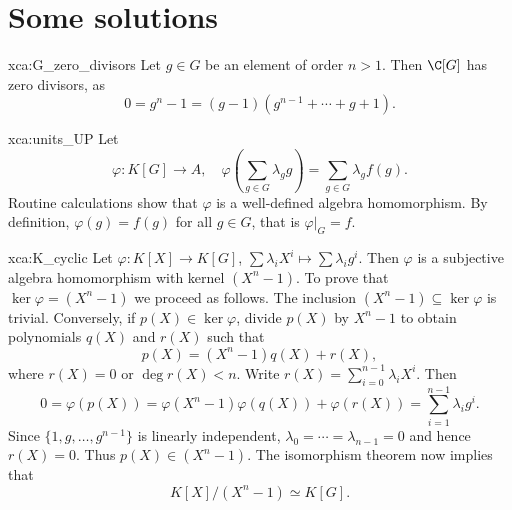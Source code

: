 \section*{Some solutions}



\begin{sol}{xca:G_zero_divisors}
    Let $g\in G$ be an element of order $n>1$.  
    Then $\C[G]$ has zero divisors, as 
    \[
    0=g^n-1=(g-1)(g^{n-1}+\cdots+g+1).
    \]
\end{sol}

\begin{sol}{xca:units_UP}
    Let 
    \[
    \varphi\colon K[G]\to A,\quad  
    \varphi\left(\sum_{g\in G}\lambda_gg\right)=\sum_{g\in G}\lambda_gf(g).
    \]
    Routine calculations show that $\varphi$ is a well-defined
    algebra homomorphism. By definition, $\varphi(g)=f(g)$ for all $g\in G$, that is $\varphi|_G=f$. 
\end{sol}

\begin{sol}{xca:K_cyclic}
    Let $\varphi\colon K[X]\to K[G]$, $\sum\lambda_iX^i\mapsto \sum\lambda_ig^i$. Then 
    $\varphi$ is a subjective 
    algebra homomorphism with kernel $(X^n-1)$. To prove that 
    $\ker\varphi=(X^n-1)$ we proceed as follows. The inclusion 
    $(X^n-1)\subseteq\ker\varphi$ is trivial. Conversely, 
    if $p(X)\in\ker\varphi$, divide $p(X)$ by 
    $X^n-1$ to obtain polynomials $q(X)$ and $r(X)$ such that
    \[
    p(X)=(X^n-1)q(X)+r(X),
    \]
    where $r(X)=0$ or $\deg r(X)<n$. Write $r(X)=\sum_{i=0}^{n-1}\lambda_iX^i$. 
    Then
    \[
    0=\varphi(p(X))=\varphi(X^n-1)\varphi(q(X))+\varphi(r(X))
    =\sum_{i=1}^{n-1}\lambda_ig^i.
    \]
    Since $\{1,g,\dots,g^{n-1}\}$ is linearly independent, 
    $\lambda_0=\cdots=\lambda_{n-1}=0$ and hence $r(X)=0$. 
    Thus $p(X)\in (X^n-1)$. The isomorphism theorem 
    now implies that 
    \[
    K[X]/(X^n-1)\simeq K[G].
    \]
\end{sol}

